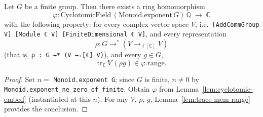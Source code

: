 \begin{theorem}
  \label{thm:brauer-character-in-cyclotomic}
  \leanok
  Let $G$ be a finite group.  Then there exists a ring homomorphism
  \[
    \varphi : \mathrm{CyclotomicField}\,(\mathrm{Monoid.exponent}\,G)\,\mathbb{Q} \;\longrightarrow\; \mathbb{C}
  \]
  with the following property: for every complex vector space $V$, i.e.\ \verb|[AddCommGroup V] [Module ℂ V] [FiniteDimensional ℂ V]|, and every representation
  \[
    \rho : G \to^\ast (V \to_{\ell[\mathbb{C}]} V)
  \]
  (that is, \verb|ρ : G →* (V →ₗ[ℂ] V)|), and every $g \in G$,
  \[
    \mathrm{tr}_{\mathbb{C}}\,V\,(\rho g) \in \varphi.\mathrm{range}.
  \]
\end{theorem}
\begin{proof}
  Set $n = $ \verb|Monoid.exponent G|; since $G$ is finite, $n \neq 0$ by \verb|Monoid.exponent_ne_zero_of_finite|.  Obtain $\varphi$ from Lemma~\ref{lem:cyclotomic-embed} (instantiated at this $n$).  For any $V$, $\rho$, $g$, Lemma~\ref{lem:trace-mem-range} provides the conclusion.
\end{proof}


